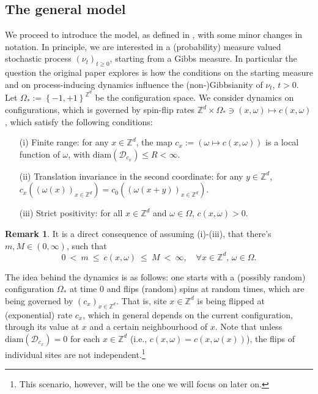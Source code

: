 \documentclass[12pt]{article}
\newcommand{\D}{\mathcal{D}}
\newcommand{\Z}{\mathbb{Z}}
\newcommand{\set}[1]{\left\{#1\right\}}
\newcommand{\1}{\mathbbm{1}}
\newcommand{\5}{\vspace{0.5cm}}
\theoremstyle{definition}
\newtheorem{rem}[thm]{Remark}
\begin{document}
\subsection{The general model}

We proceed to introduce the model, as defined in \cite{EFHR}, with some minor changes in notation. In principle, we are interested in a (probability) measure valued stochastic process $(\nu_t)_{t\geq 0}$, starting from a Gibbs measure. In particular the question the original paper explores is how the conditions on the starting measure and on process-inducing dynamics influence the (non-)Gibbsianity of $\nu_t$, $t>0$. \\

Let $\Omega_*:=\set{-1,+1}^{\Z^d}$ be the configuration space. We consider dynamics on configurations, which is governed by spin-flip rates $\Z^d\times\Omega_*\ni(x,\omega)\mapsto c(x,\omega)$, which satisfy the following conditions:
\begin{itemize}
	\item[(i)] Finite range: for any $x\in\Z^d$, the map $c_x:=(\omega\mapsto c(x,\omega))$ is a local function of $\omega$, with $\mathrm{diam}(\D_{c_x})\leq R<\infty$.
	\item[(ii)] Translation invariance in the second coordinate: for any $y\in\Z^d$, $c_x((\omega(x))_{x\in\Z^d})=c_0((\omega(x+y))_{x\in\Z^d})$.
	\item[(iii)] Strict positivity: for all $x\in\Z^d$ and $\omega\in\Omega$, $c(x,\omega)>0$.
\end{itemize}

\begin{rem}
It is a direct consequence of assuming (i)-(iii), that there's $m,M\in(0,\infty)$, such that 
$$0 ~<~ m ~\leq~ c(x,\omega) ~\leq~ M ~<~ \infty, \quad \forall x\in\Z^d,\,\omega\in\Omega.$$
\end{rem}

The idea behind the dynamics is as follows: one starts with a (possibly random) configuration $\Omega_*$ at time $0$ and flips (random) spins at random times, which are being governed by $(c_x)_{x\in\Z^d}$. That is, site $x\in\Z^d$ is being flipped at (exponential) rate $c_x$, which in general depends on the current configuration, through its value at $x$ and a certain neighbourhood of $x$. Note that unless $\mathrm{diam}(\D_{c_x})=0$ for each $x\in\Z^d$ (i.e., $c(x,\omega)=c(x,\omega(x))$), the flips of individual sites are not independent.\footnote{This scenario, however, will be the one we will focus on later on.} \\
\end{document}
